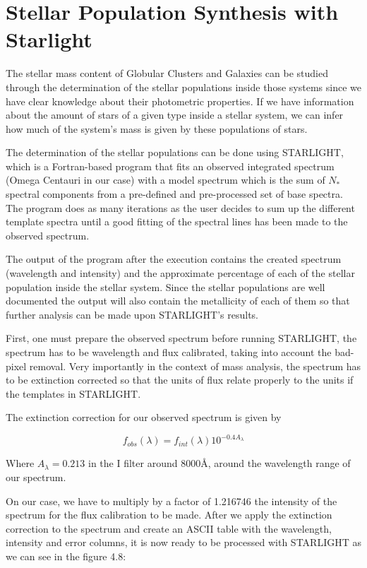 \section{Stellar Population Synthesis with Starlight}

The stellar mass content of Globular Clusters and Galaxies can be studied through the determination of the stellar populations inside those systems since we have clear knowledge about their photometric properties. If we have information about the amount of stars of a given type inside a stellar system, we can infer how much of the system's mass is given by these populations of stars. 

The determination of the stellar populations can be done using STARLIGHT, which is a Fortran-based program that fits an observed integrated spectrum (Omega Centauri in our case) with a model spectrum which is the sum of $N_{*}$ spectral components from a pre-defined and pre-processed set of base spectra. The program does as many iterations as the user decides to sum up the different template spectra until a good fitting of the spectral lines has been made to the observed spectrum. 

The output of the program after the execution contains the created spectrum (wavelength and intensity) and the approximate percentage of each of the stellar population inside the stellar system. Since the stellar populations are well documented the output will also contain the metallicity of each of them so that further analysis can be made upon STARLIGHT's results.

First, one must prepare the observed spectrum before running STARLIGHT, the spectrum has to be wavelength and flux calibrated, taking into account the bad-pixel removal. Very importantly in the context of mass analysis, the spectrum has to be extinction corrected so that the units of flux relate properly to the units if the templates in STARLIGHT.     

The extinction correction for our observed spectrum is given by

\begin{equation}
f_{obs}(\lambda)=f_{int}(\lambda)10^{-0.4A_{\lambda}}
\end{equation}

Where $A_{\lambda}=0.213$ in the I filter around $8000 \textrm{\AA}$, around the wavelength range of our spectrum. 

On our case, we have to multiply by a factor of 1.216746 the intensity of the spectrum for the flux calibration to be made. After we apply the extinction correction to the spectrum and create an ASCII table with the wavelength, intensity and error columns, it is now ready to be processed with STARLIGHT as we can see in the figure 4.8:

